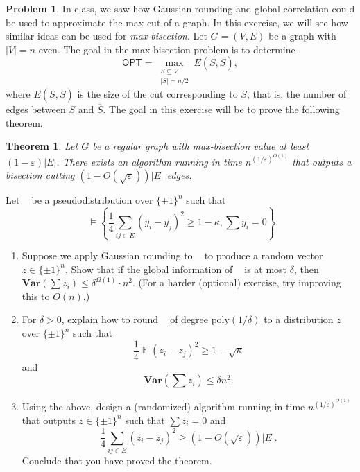 \documentclass[11pt]{article}
\newtheorem*{theorem*}{Theorem}
\theoremstyle{definition}
\newtheorem{problem}[theorem]{Problem}
\newcommand{\poly}{\mathrm{poly}}
\renewcommand{\epsilon}{\varepsilon}
\newcommand{\eps}{\epsilon}
\DeclareMathOperator{\E}{\mathbb{E}} %
\DeclareMathOperator{\pE}{\widetilde{\mathbb{E}}} %
\newcommand{\Var}{\mathbf{Var}}
\newcommand{\OPT}{\mathsf{OPT}}
\begin{document}
\begin{problem}
  In class, we saw how Gaussian rounding and global correlation could be used to approximate the max-cut of a graph. In this exercise, we will see how similar ideas can be used for \emph{max-bisection}. Let $G = (V,E)$ be a graph with $|V|=n$ even. The goal in the max-bisection problem is to determine
  \[ \OPT = \max_{\substack{S \subseteq V \\ |S| = n/2}} E(S,\overline{S}), \]
  where $E(S,\overline{S})$ is the size of the cut corresponding to $S$, that is, the number of edges between $S$ and $\overline{S}$. The goal in this exercise will be to prove the following theorem.

  \begin{theorem*}
    Let $G$ be a regular graph with max-bisection value at least $(1-\eps) |E|$. There exists an algorithm running in time $n^{(1/\eps)^{O(1)}}$ that outputs a bisection cutting $(1-O(\sqrt{\eps})) |E|$ edges.
  \end{theorem*}

  Let $\pE$ be a pseudodistribution over $\{\pm 1\}^n$ such that
  \[ \pE \vDash \left\{ \frac{1}{4} \sum_{ij \in E} (y_i-y_j)^2 \ge 1 - \kappa , \sum y_i = 0 \right\}. \]

  \begin{enumerate}
    \item Suppose we apply Gaussian rounding to $\pE$ to produce a random vector $z \in \{\pm 1\}^n$. Show that if the global information of $\pE$ is at most $\delta$, then $\Var \left(\sum z_i\right) \le \delta^{\Omega(1)} \cdot n^2$. (For a harder (optional) exercise, try improving this to $O(n)$.)

    \item For $\delta > 0$, explain how to round $\pE$ of degree $\poly(1/\delta)$ to a distribution $z$ over $\{\pm 1\}^n$ such that
    \[ \frac{1}{4} \E (z_i - z_j)^2 \ge 1 - \sqrt{\kappa} \]
    and
    \[ \Var \left( \sum z_i \right) \le \delta n^2. \]

    \item Using the above, design a (randomized) algorithm running in time $n^{(1/\eps)^{O(1)}}$ that outputs $z \in \{\pm 1\}^n$ such that $\sum z_i = 0$ and
    \[ \frac{1}{4} \sum_{ij \in E} (z_i - z_j)^2 \ge (1-O(\sqrt{\eps})) |E|. \]
    Conclude that you have proved the theorem.
  \end{enumerate}
\end{problem}
\end{document}
